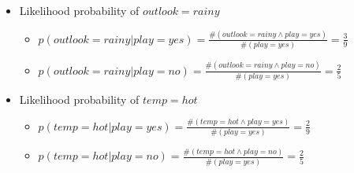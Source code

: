 \documentclass[xcolor=table]{beamer}
\begin{document}
\begin{frame}
\begin{minipage}{0.64\textwidth}
\begin{itemize}
\begin{itemize}
			\end{itemize}
			\item Likelihood probability of $ outlook=rainy $
			\begin{itemize}
				\item $p(outlook=rainy|play=yes) = \frac{\#(outlook=rainy \wedge play = yes)}{\#(play = yes)} = \frac{3}{9}$
				\item $p(outlook=rainy|play=no) = \frac{\#(outlook=rainy \wedge play = no)}{\#(play = yes)} = \frac{2}{5}$
			\end{itemize}
			\item Likelihood probability of $ temp=hot $
			\begin{itemize}
				\item $p(temp=hot|play=yes) = \frac{\#(temp=hot \wedge play = yes)}{\#(play = yes)} = \frac{2}{9}$
				\item $p(temp=hot|play=no) = \frac{\#(temp=hot \wedge play = no)}{\#(play = yes)} = \frac{2}{5}$
			\end{itemize}
		\end{itemize}
	\end{minipage}
	
\end{frame}
\end{document}
